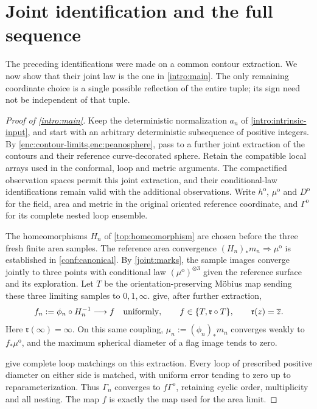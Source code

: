 \section{Joint identification and the full sequence}\label{joint:section}

The preceding identifications were made on a common contour extraction.
We now show that their joint law is the one in \cref{intro:main}.
The only remaining coordinate choice is a single possible reflection
of the entire tuple; its sign need not be independent of that tuple.

\begin{proof}[Proof of \cref{intro:main}]
Keep the deterministic normalization $a_n$ of
\cref{intro:intrinsic-input}, and start with an arbitrary deterministic
subsequence of positive integers. By
\cref{enc:contour-limits,enc:peanosphere}, pass to a further joint
extraction of the contours and their reference curve-decorated sphere.
Retain the compatible local arrays used in the conformal, loop and
metric arguments. The compactified observation spaces permit this
joint extraction, and their conditional-law identifications remain
valid with the additional observations. Write $h^{\mathrm o}$,
$\mu^{\mathrm o}$ and $D^{\mathrm o}$ for the field, area and metric
in the original oriented reference coordinate, and
$\Gamma^{\mathrm o}$ for its complete nested loop ensemble.

The homeomorphisms $H_n$ of \cref{top:homeomorphism} are chosen before
the three fresh finite area samples. The reference area convergence
$(H_n)_*m_n\Rightarrow\mu^{\mathrm o}$ is established in
\cref{conf:canonical}. By \cref{joint:marks}, the sample images
converge jointly to three points with conditional law
$(\mu^{\mathrm o})^{\otimes3}$ given the reference surface and its
exploration. Let $T$ be the orientation-preserving
M\"obius map sending these three limiting samples to $0,1,\infty$.
 give, after further extraction,
\[
 f_n:=\phi_n\circ H_n^{-1}\longrightarrow f
 \quad\hbox{uniformly},\qquad
 f\in\{T,\mathfrak r\circ T\},
 \qquad \mathfrak r(z)=\overline z.
\]
Here $\mathfrak r(\infty)=\infty$. On this same coupling,
$\mu_n:=(\phi_n)_*m_n$ converges weakly to $f_*\mu^{\mathrm o}$,
and the maximum spherical diameter of a flag image tends to zero.

 give complete loop matchings on
this extraction. Every loop of prescribed positive diameter on either
side is matched, with uniform error tending to zero up to
reparameterization. Thus $\Gamma_n$ converges to
$f\Gamma^{\mathrm o}$, retaining cyclic order, multiplicity and all
nesting. The map $f$ is exactly the map used for the area limit.


\end{proof}
